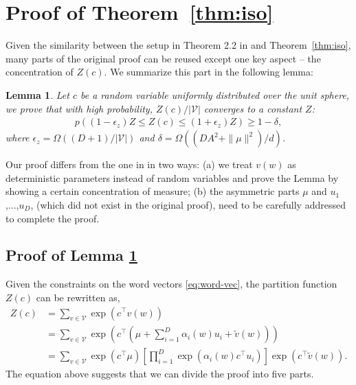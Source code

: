\documentclass{article} \usepackage{acl2017,times}
\newtheorem{lemma}[theorem]{Lemma}
\begin{document}
\section{Proof of Theorem~\ref{thm:iso}}
\label{app:iso}


Given the similarity between the setup in Theorem 2.2 in \citep{arora2015rand} and Theorem~\ref{thm:iso}, many parts of the original proof can be reused except one key aspect -- the concentration of $Z(c)$. We summarize this part in the following lemma:
\begin{lemma}
\label{lemma}
Let $c$ be a random variable uniformly distributed over the unit sphere, we prove that with high probability, $Z(c) / |\mathcal{V}|$ converges to a constant $Z$:
    \begin{align*}
    p((1-\epsilon_z)Z \le Z(c) \le (1+\epsilon_z) Z) \ge 1-\delta,
\end{align*}
where $\epsilon_z = \Omega((D+1)/|\mathcal{V}|)$ and $\delta = \Omega((DA^2 + \|\mu\|^2)/d)$.
\end{lemma}
Our proof differs from the one in \citep{arora2015rand} in two ways: (a) we treat  $v(w)$ as deterministic parameters instead of random variables and prove the Lemma by showing a certain concentration of measure;  (b) the asymmetric parts $\mu$ and $u_1$,...,$u_D$, (which did not exist in the original proof),   need to be carefully addressed to complete the proof.

\subsection{Proof of Lemma \ref{lemma}}
Given the constraints on the word vectors \eqref{eq:word-vec}, the partition function $Z(c)$ can be rewritten as,
\begin{align*}
    Z(c) &= \sum_{v\in \mathcal{V}} \exp(c^{\top} v(w)) \\
    &= \sum_{v\in \mathcal{V}} \exp\left(c^{\top} \left(\mu  + \sum_{i=1}^D \alpha_i(w) u_i + \tilde{v}(w) \right)\right) \\
    &=  \sum_{v\in \mathcal{V}} \exp(c^{\top} \mu) \left[ \prod_{i=1}^D \exp(\alpha_i(w) c^{\top} u_i) \right] \exp\left(c^{\top} \tilde{v}(w)\right).
\end{align*}
The equation above suggests that we can divide the proof into five parts.
\end{document}
